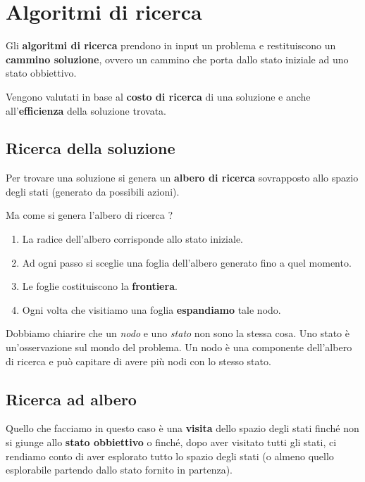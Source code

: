 \chapter{Algoritmi di ricerca}
Gli \textbf{algoritmi di ricerca} prendono in input un problema e restituiscono un
\textbf{cammino soluzione}, ovvero un cammino che porta dallo stato iniziale ad uno stato
obbiettivo.

Vengono valutati in base al \textbf{costo di ricerca} di una soluzione e anche
all'\textbf{efficienza} della soluzione trovata.

\section{Ricerca della soluzione}
Per trovare una soluzione si genera un \textbf{albero di ricerca} sovrapposto allo spazio
degli stati (generato da possibili azioni).

Ma come si genera l'albero di ricerca ?
\begin{enumerate}
	\item La radice dell'albero corrisponde allo stato iniziale.
	\item Ad ogni passo si sceglie una foglia dell'albero generato fino a quel momento.
	\item Le foglie costituiscono la \textbf{frontiera}.
	\item Ogni volta che visitiamo una foglia \textbf{espandiamo} tale nodo.
\end{enumerate}
Dobbiamo chiarire che un \emph{nodo} e uno \emph{stato} non sono la stessa cosa. Uno stato
\`e un'osservazione sul mondo del problema. Un nodo \`e una componente dell'albero di
ricerca e pu\`o capitare di avere pi\`u nodi con lo stesso stato.

\section{Ricerca ad albero}
Quello che facciamo in questo caso \`e una \textbf{visita} dello spazio degli stati finch\'e non
si giunge allo \textbf{stato obbiettivo} o finch\'e, dopo aver visitato tutti gli stati, ci
rendiamo conto di aver esplorato tutto lo spazio degli stati (o almeno quello esplorabile
partendo dallo stato fornito in partenza).

